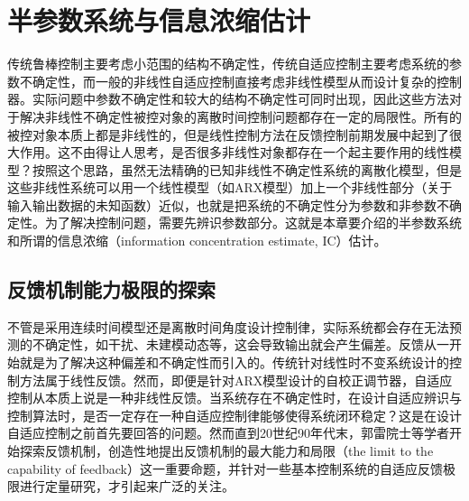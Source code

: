 \chapter{半参数系统与信息浓缩估计}\label{chap:2}

传统鲁棒控制主要考虑小范围的结构不确定性，传统自适应控制主要考虑系统的参数不确定性，而一般的非线性自适应控制直接考虑非线性模型从而设计复杂的控制器。实际问题中参数不确定性和较大的结构不确定性可同时出现，因此这些方法对于解决非线性不确定性被控对象的离散时间控制问题都存在一定的局限性。所有的被控对象本质上都是非线性的，但是线性控制方法在反馈控制前期发展中起到了很大作用。这不由得让人思考，是否很多非线性对象都存在一个起主要作用的线性模型？按照这个思路，虽然无法精确的已知非线性不确定性系统的离散化模型，但是这些非线性系统可以用一个线性模型（如ARX模型）加上一个非线性部分（关于输入输出数据的未知函数）近似，也就是把系统的不确定性分为参数和非参数不确定性。为了解决控制问题，需要先辨识参数部分。这就是本章要介绍的半参数系统和所谓的信息浓缩（information concentration estimate, IC）估计。

\section{反馈机制能力极限的探索}\label{sect:2.1}
不管是采用连续时间模型还是离散时间角度设计控制律，实际系统都会存在无法预测的不确定性，如干扰、未建模动态等，这会导致输出就会产生偏差。反馈从一开始就是为了解决这种偏差和不确定性而引入的。传统针对线性时不变系统设计的控制方法属于线性反馈。然而，即便是针对ARX模型设计的自校正调节器，自适应控制从本质上说是一种非线性反馈。当系统存在不确定性时，在设计自适应辨识与控制算法时，是否一定存在一种自适应控制律能够使得系统闭环稳定？这是在设计自适应控制之前首先要回答的问题。然而直到20世纪90年代末，郭雷院士等学者开始探索反馈机制，创造性地提出反馈机制的最大能力和局限（the limit to the capability of feedback）这一重要命题，并针对一些基本控制系统的自适应反馈极限进行定量研究，才引起来广泛的关注。

